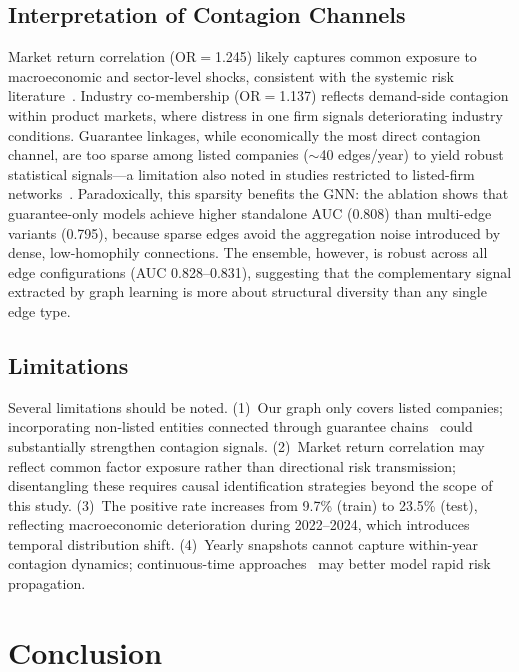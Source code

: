 \documentclass[3p,times,procedia]{elsarticle}
\begin{document}
\subsection{Interpretation of Contagion Channels}
\label{subsec:channels}

Market return correlation (OR$=$1.245) likely captures common exposure to macroeconomic and sector-level shocks, consistent with the systemic risk literature~\cite{niu2020guarantee}.
Industry co-membership (OR$=$1.137) reflects demand-side contagion within product markets, where distress in one firm signals deteriorating industry conditions.
Guarantee linkages, while economically the most direct contagion channel, are too sparse among listed companies ($\sim$40 edges/year) to yield robust statistical signals---a limitation also noted in studies restricted to listed-firm networks~\cite{lv2023guarantee}.
Paradoxically, this sparsity benefits the GNN: the ablation shows that guarantee-only models achieve higher standalone AUC (0.808) than multi-edge variants (0.795), because sparse edges avoid the aggregation noise introduced by dense, low-homophily connections.
The ensemble, however, is robust across all edge configurations (AUC 0.828--0.831), suggesting that the complementary signal extracted by graph learning is more about structural diversity than any single edge type.

\subsection{Limitations}
\label{subsec:limitations}

Several limitations should be noted.
(1)~Our graph only covers listed companies; incorporating non-listed entities connected through guarantee chains~\cite{cheng2022contagion} could substantially strengthen contagion signals.
(2)~Market return correlation may reflect common factor exposure rather than directional risk transmission; disentangling these requires causal identification strategies beyond the scope of this study.
(3)~The positive rate increases from 9.7\% (train) to 23.5\% (test), reflecting macroeconomic deterioration during 2022--2024, which introduces temporal distribution shift.
(4)~Yearly snapshots cannot capture within-year contagion dynamics; continuous-time approaches~\cite{rossi2020temporal} may better model rapid risk propagation.


\section{Conclusion}
\label{sec:conclusion}
\end{document}
